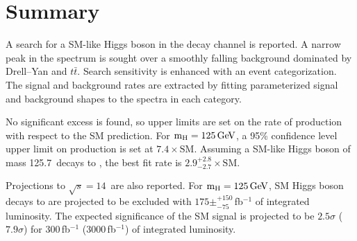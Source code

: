 \documentclass[10pt]{article}
\def\Acknowledgements{\bigskip  \bigskip \begin{center} \begin{large}
             \bf ACKNOWLEDGEMENTS \end{large}\end{center}}
\begin{document}
\section{Summary}

A search for a SM-like Higgs boson in the \mm{} decay channel is reported.
A narrow \hmm{} peak in the \Mmumu{} spectrum is sought over a smoothly
falling background dominated by Drell--Yan and $t\bar{t}$.  Search
sensitivity is enhanced with an event categorization.  The
signal and background rates are extracted by fitting parameterized
signal and background shapes to the \Mmumu{} spectra in each category.

No significant excess is found, so upper limits are set on the
rate of \hmm{} production with respect to the SM prediction.
For $\mathrm{m_H}{}=125\,\mathrm{Ge\kern -0.1em V}{}{}$, a 95\% confidence level upper limit
on \hmm{} production is set at $7.4\times\mathrm{SM}$.
Assuming a SM-like Higgs boson of mass 125.7\,\GeVcc{} decays to \mm{},
the best fit rate is $2.9^{+2.8}_{-2.7}\times\mathrm{SM}$.

Projections to $\sqrt{s}=14$\,\TeV{} are also reported.  For $\mathrm{m_H}{}=125\,\mathrm{Ge\kern -0.1em V}{}{}$,
SM Higgs boson decays to \mm{} are projected to be excluded with
$175\pm^{+150}_{-75}$\,fb$^{-1}$ of integrated luminosity.  The expected significance
of the SM \hmm{} signal is projected to be 
$2.5\sigma$ ($7.9\sigma$) for 300\,fb$^{-1}$ (3000\,fb$^{-1}$) of integrated luminosity.

\end{document}
